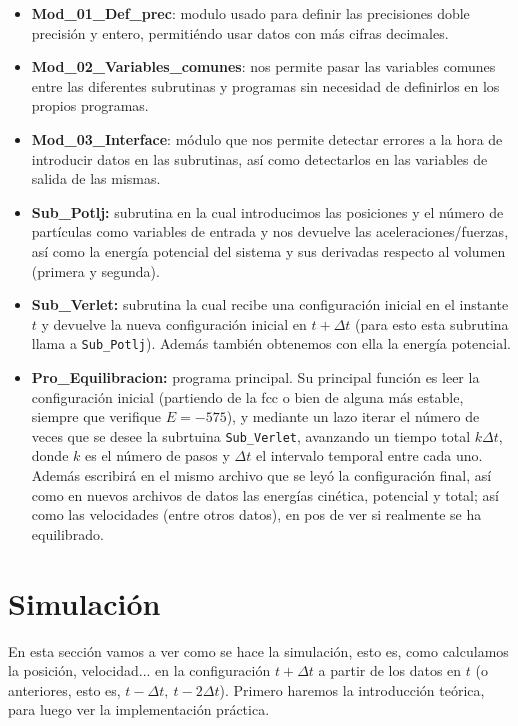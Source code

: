 \documentclass[11pt]{article} %
\begin{document}
\begin{itemize}
	\item \textbf{Mod\_01\_Def\_prec}: modulo usado para definir las precisiones doble precisión y entero, permitiéndo usar datos con más cifras decimales.
	\item \textbf{Mod\_02\_Variables\_comunes}: nos permite pasar las variables comunes entre las diferentes subrutinas y programas sin necesidad de definirlos en los propios programas.
	\item \textbf{Mod\_03\_Interface}: módulo que nos permite detectar errores a la hora de introducir datos en las subrutinas, así como detectarlos en las variables de salida de las mismas.
	\item \textbf{Sub\_Potlj:} subrutina en la cual introducimos las posiciones y el número de partículas como variables de entrada y nos devuelve las aceleraciones/fuerzas, así como la energía potencial del sistema y sus derivadas respecto al volumen (primera y segunda).
	\item \textbf{Sub\_Verlet:} subrutina la cual recibe una configuración inicial en el instante $t$ y devuelve la nueva configuración inicial en $t+\Delta t$ (para esto esta subrutina llama a \texttt{Sub\_Potlj}). Además también obtenemos con ella la energía potencial.
	\item \textbf{Pro\_Equilibracion:} programa principal. Su principal función es leer la configuración inicial (partiendo de la fcc o bien de alguna más estable, siempre que verifique $E=-575$), y mediante un lazo iterar el número de veces que se desee la subrtuina \texttt{Sub\_Verlet}, avanzando un tiempo total $k\Delta t$, donde $k$ es el número de pasos y $\Delta t$ el intervalo temporal entre cada uno. Además escribirá en el mismo archivo que se leyó la configuración final, así como en nuevos archivos de datos las energías cinética, potencial y total; así como las velocidades (entre otros datos), en pos de ver si realmente se ha equilibrado.
\end{itemize}


\section{Simulación}

En esta sección vamos a ver como se hace la simulación, esto es, como calculamos la posición, velocidad... en la configuración $t+\Delta t$ a partir de los datos en $t$ (o anteriores, esto es, $t  - \Delta t, \ t - 2 \Delta t$). Primero haremos la introducción teórica, para luego ver la implementación práctica.
\end{document}
